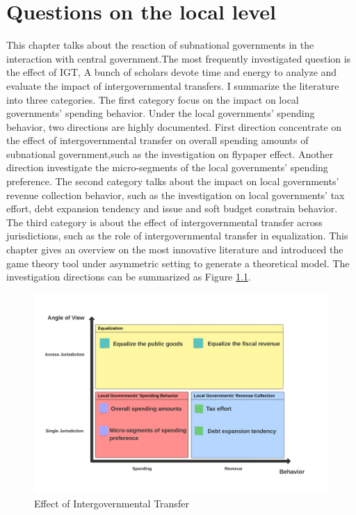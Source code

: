 
\chapter{Questions on the  local level}
This chapter talks about the reaction of subnational governments in the interaction with central government.The most frequently investigated question is the effect of IGT, A bunch of scholars devote time and energy to analyze and evaluate the impact of intergovernmental transfers. I summarize the literature into three categories. The first category focus on the impact on local governments' spending behavior. Under the local governments' spending behavior, two directions are highly documented. First direction concentrate on the effect of intergovernmental transfer on overall spending amounts of subnational government,such as the investigation on flypaper effect. Another direction investigate the micro-segments of the local governments' spending preference. The second category talks about the impact on local governments' revenue collection behavior, such as the investigation on local governments' tax effort, debt expansion tendency and issue and soft budget constrain behavior. The third category is about the effect of intergovernmental transfer across jurisdictions, such as the role of intergovernmental transfer in equalization. This chapter gives an overview on the most innovative literature and introduced the game theory tool under asymmetric setting to generate a theoretical model. The investigation directions can be summarized as Figure \ref*{Figure 3.1}.

\begin{figure}[H]
    \centering
    \includegraphics[scale=0.4]{Chapter-3/Figures/Effect of Intergovernmental Transfer.jpeg}
    \caption{Effect of Intergovernmental Transfer
        \texttt{} }
    \label{Figure 3.1}
\end{figure}


